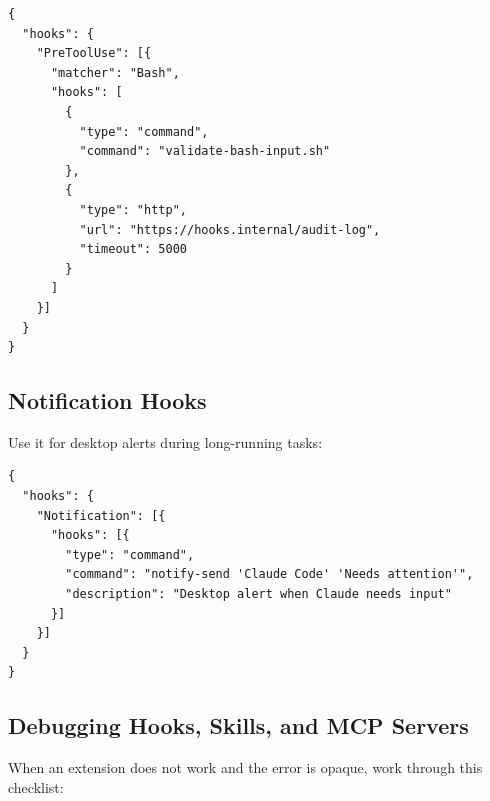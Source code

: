 \begin{verbatim}
{
  "hooks": {
    "PreToolUse": [{
      "matcher": "Bash",
      "hooks": [
        {
          "type": "command",
          "command": "validate-bash-input.sh"
        },
        {
          "type": "http",
          "url": "https://hooks.internal/audit-log",
          "timeout": 5000
        }
      ]
    }]
  }
}
\end{verbatim}

\subsection{Notification Hooks}

Use it for desktop alerts during long-running tasks:

\begin{verbatim}
{
  "hooks": {
    "Notification": [{
      "hooks": [{
        "type": "command",
        "command": "notify-send 'Claude Code' 'Needs attention'",
        "description": "Desktop alert when Claude needs input"
      }]
    }]
  }
}
\end{verbatim}


\subsection{Debugging Hooks, Skills, and MCP Servers}
\label{subsec:debugging-extensions}


When an extension does not work and the error is opaque, work through
this checklist:

